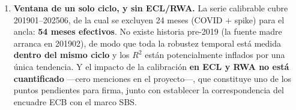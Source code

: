 \documentclass[12pt, a4paper]{article}
\begin{document}
\begin{enumerate}[nosep]
    \textbf{$+16{,}8$ bps} (hazard de la población). \textbf{No es reconstruible un Kaplan-Meier
    propio}: el maestro tiene \texttt{target\_12m} (binario) y \texttt{miss\_12t} (conteo) pero
    \textbf{no tiempo-hasta-evento}, y un intento previo de KM dio signo contrario ($-43$ bps) por
    repartir el evento uniformemente. Se usa la cota contrafactual.
  \item \textbf{Ventana de un solo ciclo, y sin ECL/RWA.} La serie calibrable cubre 201901--202506,
    de la cual se excluyen 24 meses (COVID $+$ spike) para el ancla: \textbf{54 meses efectivos}. No
    existe historia pre-2019 (la fuente madre arranca en 201902), de modo que toda la robustez
    temporal está medida \textbf{dentro del mismo ciclo} y los $R^2$ están potencialmente inflados
    por una única tendencia. Y el impacto de la calibración \textbf{en ECL y RWA no está
    cuantificado} ---cero menciones en el proyecto---, que constituye uno de los
    puntos pendientes para firma, junto con establecer la correspondencia del encuadre ECB con el
    marco SBS.
\end{enumerate}

\newpage
\end{document}
